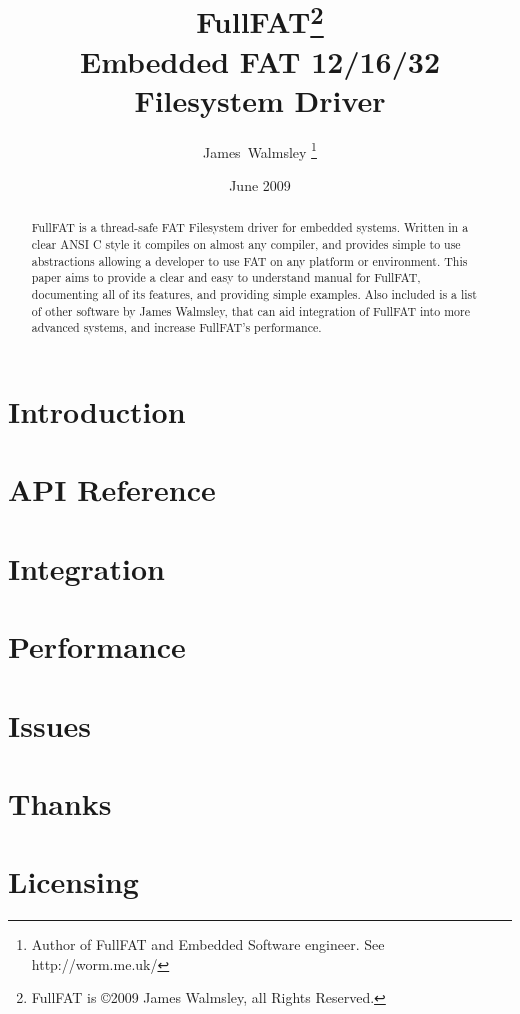\documentclass[final,a4paper,12pt]{article}
\begin{document}
\title{\Huge{FullFAT\footnote {FullFAT is \copyright  2009 James Walmsley, all Rights Reserved.}}\\\Large{Embedded FAT 12/16/32 Filesystem Driver}}
\author{James~Walmsley \thanks{Author of FullFAT and Embedded Software engineer. See http://worm.me.uk/}}
\date{June 2009}
\maketitle

\begin {abstract} 
FullFAT is a thread-safe FAT Filesystem driver for embedded systems. Written in a clear ANSI C style it compiles on almost any compiler, and provides simple to use abstractions allowing a developer to use FAT on any platform or environment. This paper aims to provide a clear and easy to understand manual for FullFAT, documenting all of its features, and providing simple examples. Also included is a list of other software by James Walmsley, that can aid integration of FullFAT into more advanced systems, and increase FullFAT's performance.
\end {abstract}

\newpage
\tableofcontents
\newpage
\section{Introduction}


\newpage
\section{API Reference}


\newpage
\section{Integration}

\newpage
\section{Performance}

\newpage
\section{Issues}

\newpage
\section{Thanks}


\newpage
\section{Licensing}

\end{document}
